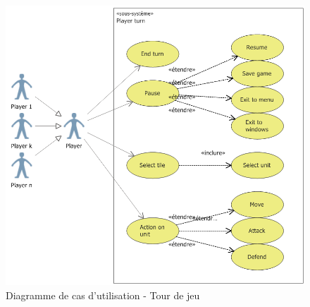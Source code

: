 		\begin{figure}[h!]
			\centering
			\includegraphics[width=1\textwidth]{figure/cas_util_partie.png}
			\caption{Diagramme de cas d'utilisation - Tour de jeu}
			\label{fig:cas_util_partie}
		\end{figure}
